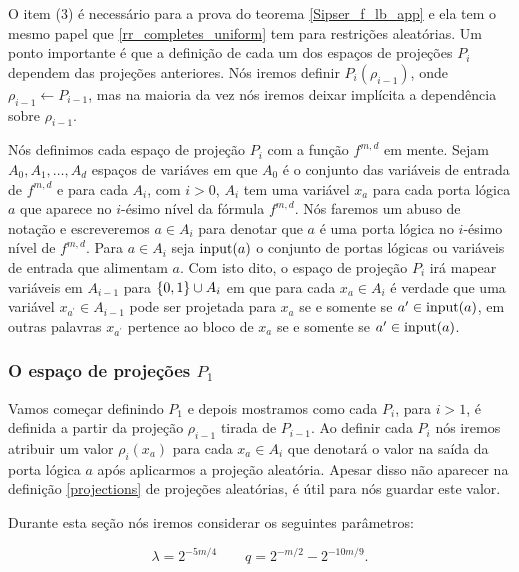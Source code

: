 O item (3) é necessário para a prova do teorema \ref{Sipser_f_lb_app} e ela tem o mesmo papel que \ref{rr_completes_uniform} tem para restrições aleatórias. Um ponto importante é que a definição de cada um dos espaços de projeções $P_{i}$ dependem das projeções anteriores. Nós iremos definir $P_{i}(\rho_{i - 1})$, onde $\rho_{i - 1} \leftarrow P_{i - 1}$, mas na maioria da vez nós iremos deixar implícita a dependência sobre $\rho_{i - 1}$.

Nós definimos cada espaço de projeção $P_{i}$ com a função $f^{m, d}$ em mente. Sejam $A_{0}, A_{1}, \dots, A_{d}$ espaços de variáves em que $A_{0}$ é o conjunto das variáveis de entrada de $f^{m, d}$ e para cada $A_{i}$, com $i > 0$, $A_{i}$ tem uma variável $x_{a}$ para cada porta lógica $a$ que aparece no $i$-ésimo nível da fórmula $f^{m, d}$. Nós faremos um abuso de notação e escreveremos $a \in A_{i}$ para denotar que $a$ é uma porta lógica no $i$-ésimo nível de $f^{m, d}$. Para $a \in A_{i}$ seja $\text{input}(a)$ o conjunto de portas lógicas ou variáveis de entrada que alimentam $a$. Com isto dito, o espaço de projeção $P_{i}$ irá mapear variáveis em $A_{i -1}$ para $\{0, 1\} \cup A_{i}$ em que para cada $x_{a} \in A_{i}$ é verdade que uma variável $x_{a^{\prime}} \in A_{i - 1}$ pode ser projetada para $x_{a}$ se e somente se $a^{\prime} \in \text{input}(a)$, em outras palavras $x_{a^{\prime}}$ pertence ao bloco de $x_{a}$ se e somente se $a^{\prime} \in \text{input}(a)$.

\subsubsection{O espaço de projeções $P_{1}$}

Vamos começar definindo $P_{1}$ e depois mostramos como cada $P_{i}$, para $i > 1$, é definida a partir da projeção $\rho_{i - 1}$ tirada de $P_{i - 1}$. Ao definir cada $P_{i}$ nós iremos atribuir um valor $\rho_{i}(x_{a})$ para cada $x_{a} \in A_{i}$ que denotará o valor na saída da porta lógica $a$ após aplicarmos a projeção aleatória. Apesar disso não aparecer na definição \ref{projections} de projeções aleatórias, é útil para nós guardar este valor. 

Durante esta seção nós iremos considerar os seguintes parâmetros:

\begin{equation} \label{lambda_q_defi}
	\lambda = 2^{-5m/4} \qquad q = 2^{-m/2} - 2^{-10m/9}.
\end{equation}

